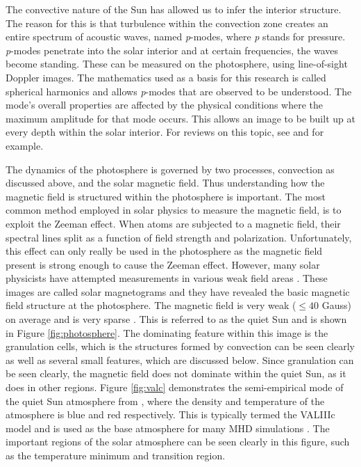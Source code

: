     The convective nature of the Sun has allowed us to infer the interior structure. 
    The reason for this is that turbulence within the convection zone creates an entire spectrum of acoustic waves, named \textit{p}-modes, where \textit{p} stands for pressure.
    \textit{p}-modes penetrate into the solar interior and at certain frequencies, the waves become standing.
    These can be measured on the photosphere, using line-of-sight Doppler images. 
    The mathematics used as a basis for this research is called spherical harmonics and allows \textit{p}-modes that are observed to be understood.
    The mode's overall properties are affected by the physical conditions where the maximum amplitude for that mode occurs. 
    This allows an image to be built up at every depth within the solar interior.
    For reviews on this topic, see \cite{annurev.aa.22.090184.003113} and \cite{RevModPhys.74.1073} for example.
    
    The dynamics of the photosphere is governed by two processes, convection as discussed above, and the solar magnetic field.
    Thus understanding how the magnetic field is structured within the photosphere is important. 
    The most common method employed in solar physics to measure the magnetic field, is to exploit the Zeeman effect.
    When atoms are subjected to a magnetic field, their spectral lines split as a function of field strength and polarization.
    Unfortunately, this effect can only really be used in the photosphere as the magnetic field present is strong enough to cause the Zeeman effect.
    However, many solar physicists have attempted measurements in various weak field areas \citep{1995ApJ...439..474M,1538-4357-613-2-L177,2008A&A...489L..57K}.
    These images are called solar magnetograms and they have revealed the basic magnetic field structure at the photosphere.
    The magnetic field is very weak ($\le 40$ Gauss) on average and is very sparse \citep{0004-637X-636-1-496,2011A&A...526A..60V}.
    This is referred to as the quiet Sun and is shown in Figure \ref{fig:photosphere}. 
    The dominating feature within this image is the granulation cells, which is the structures formed by convection can be seen clearly as well as several small features, which are discussed below. 
    Since granulation can be seen clearly, the magnetic field does not dominate within the quiet Sun, as it does in other regions.
    Figure \ref{fig:valc} demonstrates the semi-empirical mode of the quiet Sun atmosphere from \cite{1981ApJS...45..635V}, where the density and temperature of the atmosphere is blue and red respectively.
    This is typically termed the VALIIIc model and is used as the base atmosphere for many MHD simulations \citep{Mumford2015,GFME13a,fedun1,fedun2,2011AnGeo..29..883S,Wedemeyer2012,Vigeesh2012,0004-637X-743-1-14}.
    The important regions of the solar atmosphere can be seen clearly in this figure, such as the temperature minimum and transition region.
    
